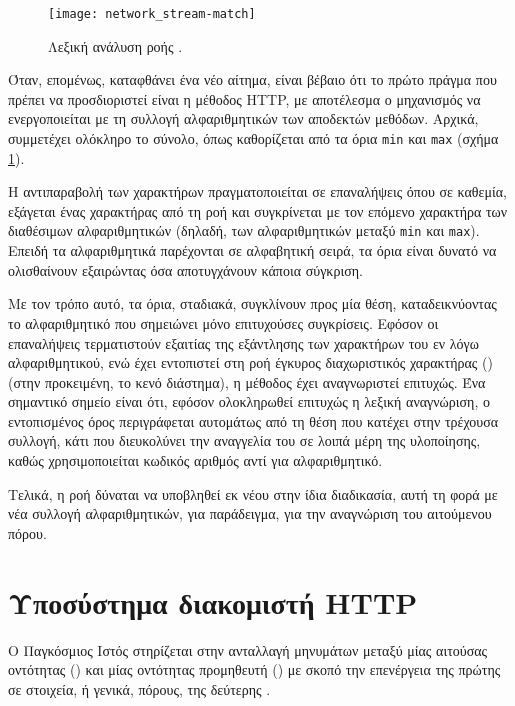 \begin{figure}
    \caption{Λεξική ανάλυση ροής . \label{fig:network:stream_match}}
    \begin{center}
    \texttt{[image: network\_stream-match]}
    \end{center}
\end{figure}

Όταν, επομένως, καταφθάνει ένα νέο αίτημα, είναι βέβαιο ότι το πρώτο πράγμα που
πρέπει να προσδιοριστεί είναι η μέθοδος HTTP, με αποτέλεσμα ο μηχανισμός να
ενεργοποιείται με τη συλλογή αλφαριθμητικών των αποδεκτών μεθόδων. Αρχικά,
συμμετέχει ολόκληρο το σύνολο, όπως καθορίζεται από τα όρια \verb~min~ και
\verb~max~ (σχήμα \ref{fig:network:stream_match}).

Η αντιπαραβολή των χαρακτήρων πραγματοποιείται σε επαναλήψεις όπου σε καθεμία,
εξάγεται ένας χαρακτήρας από τη ροή και συγκρίνεται με τον επόμενο χαρακτήρα
των διαθέσιμων αλφαριθμητικών (δηλαδή, των αλφαριθμητικών μεταξύ \verb~min~ και
\verb~max~). Επειδή τα αλφαριθμητικά παρέχονται σε αλφαβητική σειρά, τα όρια
είναι δυνατό να ολισθαίνουν εξαιρώντας όσα αποτυγχάνουν κάποια σύγκριση.

Με τον τρόπο αυτό, τα όρια, σταδιακά, συγκλίνουν προς μία θέση, καταδεικνύοντας
το αλφαριθμητικό που σημειώνει μόνο επιτυχούσες συγκρίσεις. Εφόσον οι
επαναλήψεις τερματιστούν εξαιτίας της εξάντλησης των χαρακτήρων του εν λόγω
αλφαριθμητικού, ενώ έχει εντοπιστεί στη ροή έγκυρος διαχωριστικός χαρακτήρας
() (στην προκειμένη, το κενό διάστημα), η μέθοδος έχει
αναγνωριστεί επιτυχώς. Ένα σημαντικό σημείο είναι ότι, εφόσον ολοκληρωθεί
επιτυχώς η λεξική αναγνώριση, ο εντοπισμένος όρος περιγράφεται αυτομάτως από τη
θέση που κατέχει στην τρέχουσα συλλογή, κάτι που διευκολύνει την αναγγελία του
σε λοιπά μέρη της υλοποίησης, καθώς χρησιμοποιείται κωδικός αριθμός αντί για
αλφαριθμητικό.

Τελικά, η ροή δύναται να υποβληθεί εκ νέου στην ίδια διαδικασία, αυτή τη φορά με
νέα συλλογή αλφαριθμητικών, για παράδειγμα, για την αναγνώριση του αιτούμενου
πόρου.



\section{Υποσύστημα διακομιστή HTTP}
\label{sec:http-server}

Ο Παγκόσμιος Ιστός στηρίζεται στην ανταλλαγή μηνυμάτων μεταξύ μίας αιτούσας
οντότητας () και μίας οντότητας προμηθευτή () με σκοπό την επενέργεια της πρώτης σε στοιχεία, ή γενικά, πόρους, της
δεύτερης \parencite{w3c:wsa}.

